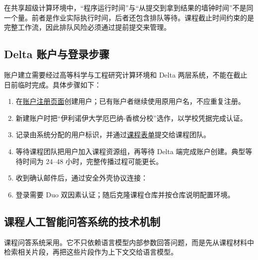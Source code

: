 \begin{keybox}
在共享超级计算环境中，“程序运行时间”与“从提交到拿到结果的墙钟时间”不是同一个量。前者是作业实际执行时间，后者还包含排队等待。课程截止时间约束的是完整工作流，因此排队风险必须通过提前提交来管理。
\end{keybox}

\subsection{Delta 账户与登录步骤}

账户建立需要经过高等科学与工程研究计算环境和 Delta 两层系统，不能在截止日前临时完成。具体步骤如下：
\begin{enumerate}
  \item 在\href{https://identity.access-ci.org/new-user}{账户注册页面}创建用户；已有账户者继续使用原用户名，不应重复注册。
  \item 新建账户时把“伊利诺伊大学厄巴纳-香槟分校”选作，以学校凭据完成认证。
  \item 记录由系统分配的用户标识，并通过\href{https://forms.illinois.edu/sec/197644781}{课程表单}提交给课程团队。
  \item 等待课程团队把用户加入课程资源组，再等待 Delta 端完成账户创建。典型等待时间为 24--48 小时，完整传播过程可能更长。
  \item
  \begin{minipage}[t]{\linewidth}
  收到确认邮件后，通过安全外壳协议连接：
  \begin{center}
  \end{center}
  \end{minipage}
  \item 登录需要 Duo 双因素认证；随后克隆课程仓库并按仓库说明配置环境。
\end{enumerate}

\subsection{课程人工智能问答系统的技术机制}

课程问答系统采用。它不只依赖语言模型内部参数回答问题，而是先从课程材料中检索相关片段，再把这些片段作为上下文交给语言模型。

